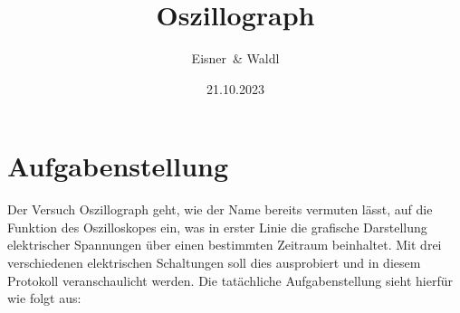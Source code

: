 \documentclass[12pt,a4paper,twoside]{article}
\begin{document}
\newcommand\laboratorynumber{2}
\title{Oszillograph}
\newcommand\supervisor{Ditlbacher, Harald}
\newcommand\groupnumber{42}

\newcommand\participantonelastname{Eisner}
\newcommand\participantonefirstname{Nico}
\newcommand\participantoneid{12214121}
\newcommand\participanttwolastname{Waldl}
\newcommand\participanttwofirstname{Philip}
\newcommand\participanttwoid{12214120}
\author{\participantonelastname \ \& \participanttwolastname}

\newcommand\degreeid{UB 033 678}
\newcommand\semester{23WS}
\date{21.10.2023}

\newcommand\coursetitle{Laborübungen 2: \\ Elektrizität, Magnetismus, Optik}

%



\tableofcontents
\newpage

\section{Aufgabenstellung} %

Der Versuch Oszillograph geht, wie der Name bereits vermuten lässt, auf die Funktion des Oszilloskopes ein, was in erster Linie die grafische Darstellung elektrischer Spannungen über einen bestimmten Zeitraum beinhaltet.
Mit drei verschiedenen elektrischen Schaltungen soll dies ausprobiert und in diesem Protokoll veranschaulicht werden. 
Die tatächliche Aufgabenstellung sieht hierfür wie folgt aus:
\end{document}
